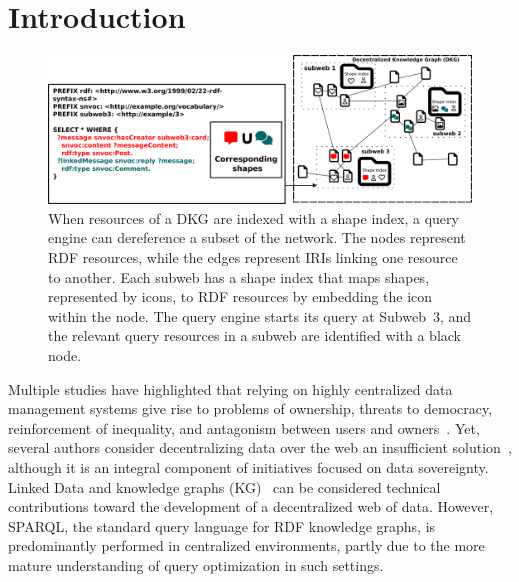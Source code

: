 \section{Introduction}

\begin{figure}
    \centering
    \includegraphics[width=1.0\linewidth]{figure/dkg.pdf}
    \caption{
    When resources of a DKG are indexed with a shape index, a query engine can dereference a subset of the network.
    The nodes represent RDF resources, while the edges represent IRIs linking one resource to another.
    Each subweb has a shape index that maps shapes, represented by icons, to RDF resources by embedding the icon within the node.
    The query engine starts its query at Subweb~3, and the relevant query resources in a subweb are identified with a black node.
    }
    \label{fig:dkg}
\end{figure}

Multiple studies have highlighted that  relying on highly centralized data management systems give rise to problems of ownership, threats to democracy, reinforcement of inequality, and antagonism between users and owners~\cite{Terranova2000FreeLP, Curran2016ch1, Sevignani2013, 9663788}.
Yet, several authors consider decentralizing data over the web an insufficient solution~\cite{9663788, Curran2016ch1}, although it is an integral component of initiatives focused on data sovereignty.
Linked Data and knowledge graphs (KG)~\cite{heath2011} can be considered technical contributions toward the development of a decentralized web of data.
However, SPARQL, the standard query language for RDF knowledge graphs, is predominantly performed in centralized environments, partly due to the more mature understanding of query optimization in such settings.

